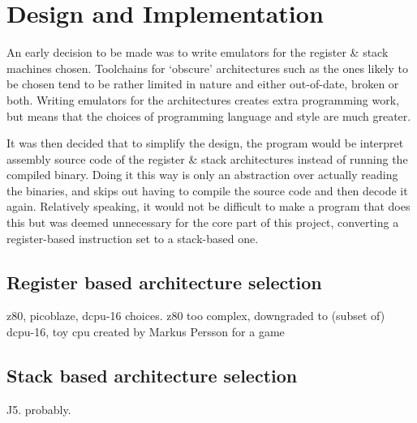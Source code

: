 \chapter{Design and Implementation}

An early decision to be made was to write emulators for the register \& stack
machines chosen. Toolchains for `obscure' architectures such as the ones likely
to be chosen tend to be rather limited in nature and either out-of-date, broken
or both. Writing emulators for the architectures creates extra programming
work, but means that the choices of programming language and style are much
greater.

It was then decided that to simplify the design, the program would be interpret
assembly source code of the register \& stack architectures instead of running
the compiled binary. Doing it this way is only an abstraction over actually
reading the binaries, and skips out having to compile the source code and then
decode it again. Relatively speaking, it would not be difficult to make a
program that does this but was deemed unnecessary for the core part of this
project, converting a register-based instruction set to a stack-based one.

\section{Register based architecture selection}
z80, picoblaze, dcpu-16 choices.
z80 too complex, downgraded to (subset of) dcpu-16, toy cpu created by Markus
Persson for a game
\section{Stack based architecture selection}
J5. probably.


